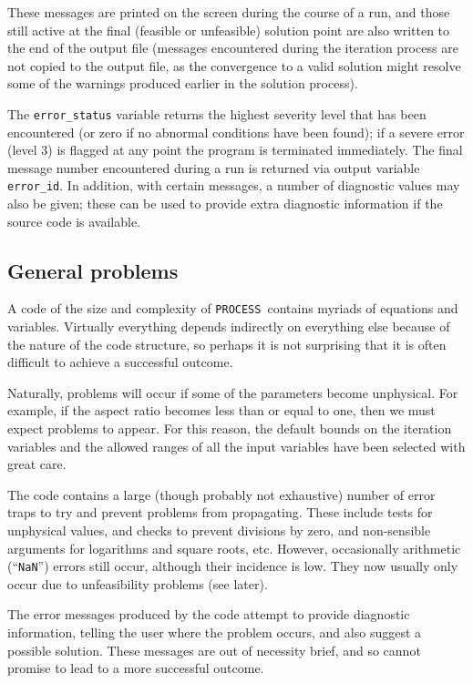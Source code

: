 \documentclass[11pt,a4paper]{report}
\newcommand{\process}{\mbox{\texttt{PROCESS}}}
\begin{document}
These messages are printed on the screen during the course of a run, and those
still active at the final (feasible or unfeasible) solution point are also
written to the end of the output file (messages encountered during the
iteration process are not copied to the output file, as the convergence to a
valid solution might resolve some of the warnings produced earlier in the
solution process).

The \texttt{error\_status} variable returns the highest severity level that
has been encountered (or zero if no abnormal conditions have been found); if a
severe error (level 3) is flagged at any point the program is terminated
immediately. The final message number encountered during a run is returned via
output variable \texttt{error\_id}. In addition, with certain messages, a
number of diagnostic values may also be given; these can be used to provide
extra diagnostic information if the source code is available.

\subsection{General problems}

A code of the size and complexity of \process\ contains myriads of equations
and variables. Virtually everything depends indirectly on everything else
because of the nature of the code structure, so perhaps it is not surprising
that it is often difficult to achieve a successful outcome.

Naturally, problems will occur if some of the parameters become unphysical.
For example, if the aspect ratio becomes less than or equal to one, then we
must expect problems to appear. For this reason, the default bounds on the
iteration variables and the allowed ranges of all the input variables have
been selected with great care.

The code contains a large (though probably not exhaustive) number of error
traps to try and prevent problems from propagating. These include tests for
unphysical values, and checks to prevent divisions by zero, and non-sensible
arguments for logarithms and square roots, etc. However, occasionally
arithmetic (``\texttt{NaN}'') errors still occur, although their incidence is
low. They now usually only occur due to unfeasibility problems (see later).

The error messages produced by the code attempt to provide diagnostic
information, telling the user where the problem occurs, and also suggest a
possible solution. These messages are out of necessity brief, and so cannot
promise to lead to a more successful outcome.
\end{document}
